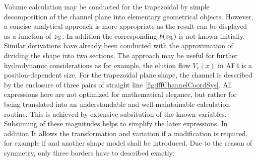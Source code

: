 Volume calculation may be conducted for the trapezoidal by simple decomposition of the channel plane into elementary 
geometrical objects. However, a concise analytical approach is more appropriate as the result can be displayed as a 
function of $z_\text{\%}$. In addition the corresponding $b(z_\text{\%})$ is not known initially. Similar derivations have already been 
conducted with the approximation of dividing the shape into two sections.
The approach may be useful for further hydrodynamic considerations as for example, the elution flow $V_e(x)$ in AF4 is 
a position-dependent size. For the trapezoidal plane shape, the channel is described by the enclosure of three pairs of 
straight line \ref{fig:fffChannelCoordSys}. All expressions here are not optimized for mathematical elegance, but 
rather for being translated into an understandable and well-maintainable calculation routine. This is achieved by 
extensive subsitution of the known variables. Subsuming of these magnitudes helps to simplify the later expressions. 
In addition It allows the transformation and variation if a modification is required, for example if and another shape 
model shall be introduced.
Due to the reason of symmetry, only three borders have to described exactly:

